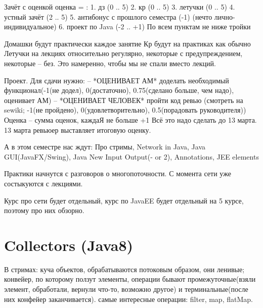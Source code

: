 Зачёт с оценкой
оценка = :
1. дз (0 .. 5)
2. кр (0 .. 5)
3. летучки (0 .. 5)
4. устный зачёт (2 .. 5)
5. антибонус с прошлого семестра (-1) (нечто лично-индивидуальное)
6. проект по Java (-2 .. +1)
По всем пунктам не ниже тройки


Домашки будут практически каждое занятие
Кр будут на практиках как обычно
Летучки на лекциях относительно регулярно, некоторые с предупреждением, некоторые -- без. Это намеренно, чтобы мы не спали вместо лекций.


Проект.
Для сдачи нужно:
	-- *ОЦЕНИВАЕТ АМ* доделать необходимый функционал(-1(не додел), 0(достаточно), 0.75(сделано больше, чем надо), оценивает АМ)
	-- *ОЦЕНИВАЕТ ЧЕЛОВЕК* пройти код ревью (смотреть на sewiki; -1(не пройдено), 0(удовлетворительно), 0.5(порадовать руководителя))
Оценка -- сумма оценок, каждаЯ не больше +1
Всё это надо сделать до 13 марта. 13 марта ревьюер выставляет итоговую оценку.


А в этом семестре нас ждут:
Про стримы,
Network in Java,
Java GUI(JavaFX/Swing),
Java New Input Output(- or 2),
Annotations,
JEE elements

Практики начнутся с разговоров о многопоточности. С момента сети уже состыкуются с лекциями.

Курс про сети будет отдельный, курс по JavaEE будет отдельный на 5 курсе, поэтому про них обзорно.

\section{Collectors (Java8)}
В стримах: куча объектов, обрабатываются потоковым образом, они ленивые; конвейер, по которому ползут элементы, операции бывают промежуточные(взяли элемент, обработали, вернули что-то, возможно другое) и терминальные(после них конфейер заканчивается). самые интересные операции: filter, map, flatMap.

